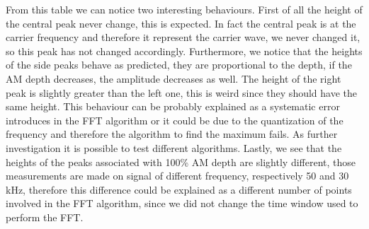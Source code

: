 \documentclass[a4paper,10pt]{article}
\begin{document}
From this table we can notice two interesting behaviours. First of all the height of the central peak never change, this is expected. In fact the central peak is at the carrier frequency and therefore it represent the carrier wave, we never changed it, so this peak has not changed accordingly. Furthermore, we notice that the heights of the side peaks behave as predicted, they are proportional to the depth, if the AM depth decreases, the amplitude decreases as well. The height of the right peak is slightly greater than the left one, this is weird since they should have the same height. This behaviour can be probably explained as a systematic error introduces in the FFT algorithm or it could be due to the quantization of the frequency and therefore the algorithm to find the maximum fails. As further investigation it is possible to test different algorithms. Lastly, we see that the heights of the peaks associated with 100\% AM depth are slightly different, those measurements are made on signal of different frequency, respectively 50 and 30 kHz, therefore this difference could be explained as a different number of points involved in the FFT algorithm, since we did not change the time window used to perform the FFT.
\end{document}
